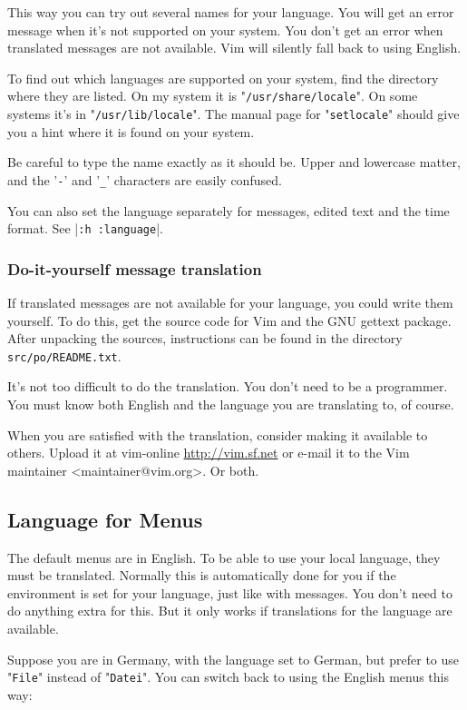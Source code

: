 This way you can try out several names for your language.
You will get an error message when it's not supported on your system.
You don't get an error when translated messages are not available.
Vim will silently fall back to using English.

To find out which languages are supported on your system, find the directory where they are listed.
On my system it is "\verb!/usr/share/locale!".
On some systems it's in "\verb!/usr/lib/locale!".
The manual page for "\verb!setlocale!" should give you a hint where it is found on your system.

Be careful to type the name exactly as it should be.
Upper and lowercase matter, and the '\verb!-!' and '\verb!_!' characters are easily confused.

You can also set the language separately for messages, edited text and the time format.
See |\verb!:h :language!|.

\subsubsection{Do-it-yourself message translation}
If translated messages are not available for your language, you could write them yourself.
To do this, get the source code for Vim and the GNU gettext package.
After unpacking the sources, instructions can be found in the directory \verb!src/po/README.txt!.

It's not too difficult to do the translation.
You don't need to be a programmer.
You must know both English and the language you are translating to, of course.

When you are satisfied with the translation, consider making it available to others.
Upload it at vim-online \url{http://vim.sf.net} or e-mail it to the Vim maintainer <maintainer@vim.org>. Or both. 
\subsection{Language for Menus}
The default menus are in English.
To be able to use your local language, they must be translated.
Normally this is automatically done for you if the environment is set for your language, just like with messages.
You don't need to do anything extra for this.
But it only works if translations for the language are available.

Suppose you are in Germany, with the language set to German, but prefer to use "\verb!File!" instead of "\verb!Datei!".
You can switch back to using the English menus this way:

